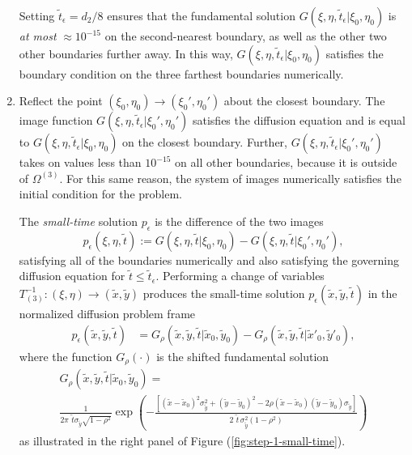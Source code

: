 \begin{enumerate}
  Setting $\tilde{t}_\epsilon = d_2/8$ ensures that the fundamental
  solution $G(\xi,\eta,\tilde{t}_\epsilon | \xi_0, \eta_0)$ is
  \textit{at most} $\approx 10^{-15}$ on the second-nearest boundary,
  as well as the other two other boundaries further away. In this way,
  $G(\xi,\eta,\tilde{t}_\epsilon | \xi_0, \eta_0)$ satisfies the
  boundary condition on the three farthest boundaries numerically.

\item Reflect the point $(\xi_0, \eta_0) \to (\xi_0', \eta_0')$ about
  the closest boundary. The image function
  $G(\xi,\eta,\tilde{t}_\epsilon | \xi_0', \eta_0')$ satisfies the
  diffusion equation and is equal to
  $G(\xi,\eta,\tilde{t}_\epsilon | \xi_0, \eta_0)$ on the closest
  boundary. Further,
  $G(\xi,\eta,\tilde{t}_\epsilon | \xi_0', \eta_0')$ takes on values
  less than $10^{-15}$ on all other boundaries, because it is outside
  of $\Omega^{(3)}$. For this same reason, the system of images numerically
  satisfies the initial condition for the problem.

  The \textit{small-time} solution $p_\epsilon$ is the difference of the two images 
  \[
    p_\epsilon(\xi,\eta,\tilde{t}) := G(\xi,\eta,\tilde{t} | \xi_0,
    \eta_0) - G(\xi,\eta,\tilde{t} | \xi_0', \eta_0'),
  \]
  satisfying all of the boundaries numerically and also satisfying the
  governing diffusion equation for
  $\tilde{t} \leq \tilde{t}_\epsilon$. Performing a change of
  variables $T_{(3)}^{-1}: (\xi,\eta) \to (\tilde{x}, \tilde{y})$
  produces the small-time solution
  $p_\epsilon(\tilde{x},\tilde{y},\tilde{t})$ in the normalized
  diffusion problem frame
  \begin{align}
    p_\epsilon(\tilde{x}, \tilde{y}, \tilde{t}) &= G_\rho(\tilde{x}, \tilde{y}, \tilde{t} | \tilde{x}_0, \tilde{y}_0) - G_\rho(\tilde{x}, \tilde{y}, \tilde{t} | \tilde{x}'_0, \tilde{y}'_0), \label{eq:p-epsilon}
  \end{align}
  where the function $G_\rho(\cdot)$ is the shifted fundamental solution
  \begin{multline}
    G_\rho(\tilde{x}, \tilde{y}, \tilde{t} | \tilde{x}_0, \tilde{y}_0) = \nonumber \\ 
    \frac{1}{2\pi\,\, \tilde{t}\sigma_{\tilde{y}}\sqrt{1-\rho^2}} \exp\left( -\frac{\left[ \left(\tilde{x}-\tilde{x}_0\right)^2 \sigma_{\tilde{y}}^2 + \left(\tilde{y}-\tilde{y}_0\right)^2 - 2\rho(\tilde{x}-\tilde{x}_0)(\tilde{y}-\tilde{y}_0)\sigma_{\tilde{y}} \right]}{2\,\,\tilde{t}\, \sigma_{\tilde{y}}^2 (1-\rho^2)} \right) \label{eq:Gfundamental}
    \end{multline}
    as illustrated in the right panel of Figure
    (\ref{fig:step-1-small-time}).
\end{enumerate}

